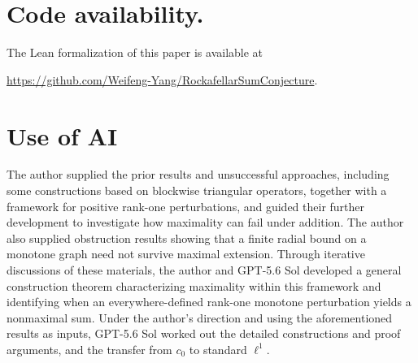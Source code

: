 \documentclass[11pt]{article}
\theoremstyle{definition}
\theoremstyle{remark}
\begin{document}
\section*{Code availability.}
The Lean formalization of this paper is available at 
\par\noindent\url{https://github.com/Weifeng-Yang/RockafellarSumConjecture}.


\section*{Use of AI}
The author supplied the prior results and unsuccessful approaches, including some constructions based on blockwise triangular operators, together with a framework for positive rank-one perturbations, and guided their further development to investigate how maximality can fail under addition. The author also supplied obstruction results showing that a finite radial bound on a monotone graph need not survive maximal extension. Through iterative discussions of these materials, the author and GPT-5.6 Sol developed a general construction theorem characterizing maximality within this framework and identifying when an everywhere-defined rank-one monotone perturbation yields a nonmaximal sum.  Under the author's direction and using the aforementioned results as inputs, GPT-5.6 Sol worked out the detailed constructions and proof arguments, and the transfer from $c_0$ to standard $\ell^1$. 





\appendix
{}
\end{document}
